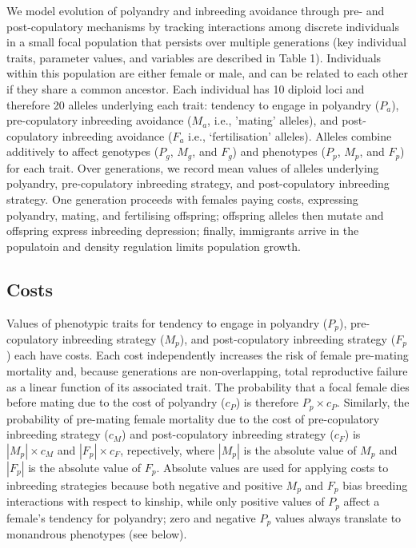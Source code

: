 \documentclass[10pt,letterpaper]{article}
\begin{document}
We model evolution of polyandry and inbreeding avoidance through pre- and post-copulatory mechanisms by tracking interactions among discrete individuals in a small focal population that persists over multiple generations (key individual traits, parameter values, and variables are described in Table 1). Individuals within this population are either female or male, and can be related to each other if they share a common ancestor. Each individual has 10 diploid loci and therefore 20 alleles underlying each trait: tendency to engage in polyandry ($P_{a}$), pre-copulatory inbreeding avoidance ($M_{a}$, i.e., 'mating' alleles), and post-copulatory inbreeding avoidance ($F_{a}$ i.e., `fertilisation' alleles). Alleles combine additively to affect genotypes ($P_{g}$, $M_{g}$, and $F_{g}$) and phenotypes ($P_{p}$, $M_{p}$, and $F_{p}$) for each trait. Over generations, we record mean values of alleles underlying polyandry, pre-copulatory inbreeding strategy, and post-copulatory inbreeding strategy. One generation proceeds with females paying costs, expressing polyandry, mating, and fertilising offspring; offspring alleles then mutate and offspring express inbreeding depression; finally, immigrants arrive in the populatoin and density regulation limits population growth.

\subsection*{Costs}

Values of phenotypic traits for tendency to engage in polyandry ($P_{p}$), pre-copulatory inbreeding strategy ($M_{p}$), and post-copulatory inbreeding strategy ($F_{p}$) each have costs. Each cost independently increases the risk of female pre-mating mortality and, because generations are non-overlapping, total reproductive failure as a linear function of its associated trait. The probability that a focal female dies before mating due to the cost of polyandry ($c_{P}$) is therefore $P_{p} \times c_{P}$. Similarly, the probability of pre-mating female mortality due to the cost of pre-copulatory inbreeding strategy ($c_{M}$) and post-copulatory inbreeding strategy ($c_{F}$) is $|M_{p}| \times c_{M}$ and $|F_{p}| \times c_{F}$, repectively, where $|M_{p}|$ is the absolute value of $M_{p}$ and $|F_{p}|$ is the absolute value of $F_{p}$. Absolute values are used for applying costs to inbreeding strategies because both negative and positive $M_{p}$ and $F_{p}$ bias breeding interactions with respect to kinship, while only positive values of $P_{p}$ affect a female's tendency for polyandry; zero and negative $P_{p}$ values always translate to monandrous phenotypes (see below).
\end{document}
